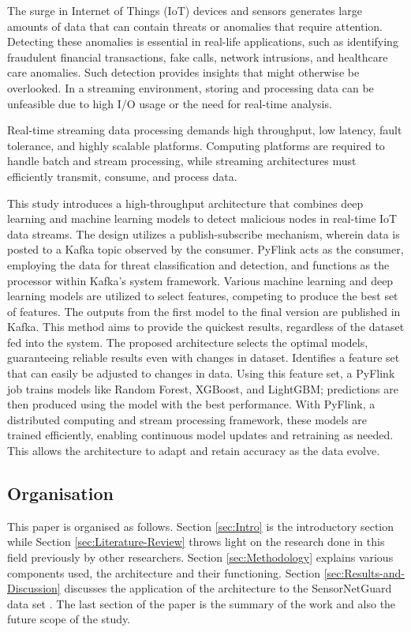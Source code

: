 \documentclass[runningheads]{llncs}
\begin{document}
The surge in Internet of Things (IoT) devices and sensors generates large amounts of data that can contain threats or anomalies that require attention. Detecting these anomalies is essential in real-life applications, such as identifying fraudulent financial transactions, fake calls, network intrusions, and healthcare care anomalies. Such detection provides insights that might otherwise be overlooked. In a streaming environment, storing and processing data can be unfeasible due to high I/O usage or the need for real-time analysis.

Real-time streaming data processing demands high throughput, low latency, fault tolerance, and highly scalable platforms. Computing platforms are required to handle batch and stream processing, while streaming architectures must efficiently transmit, consume, and process data.

This study introduces a high-throughput architecture that combines deep learning and machine learning models to detect malicious nodes in real-time IoT data streams. The design utilizes a publish-subscribe mechanism, wherein data is posted to a Kafka topic observed by the consumer. PyFlink acts as the consumer, employing the data for threat classification and detection, and functions as the processor within Kafka's system framework. Various machine learning and deep learning models are utilized to select features, competing to produce the best set of features. The outputs from the first model to the final version are published in Kafka. This method aims to provide the quickest results, regardless of the dataset fed into the system. The proposed architecture selects the optimal models, guaranteeing reliable results even with changes in dataset. Identifies a feature set that can easily be adjusted to changes in data. Using this feature set, a PyFlink job trains models like Random Forest, XGBoost, and LightGBM; predictions are then produced using the model with the best performance. With PyFlink, a distributed computing and stream processing framework, these models are trained efficiently, enabling continuous model updates and retraining as needed. This allows the architecture to adapt and retain accuracy as the data evolve.

\subsection{Organisation}
This paper is organised as follows. Section \ref{sec:Intro} is the introductory section while Section \ref{sec:Literature-Review} throws light on the research done in this field previously by other researchers. Section \ref{sec:Methodology} explains various components used, the architecture and their functioning. Section \ref{sec:Results-and-Discussion} discusses the application of the architecture to the SensorNetGuard data set \cite{b3}. The last section of the paper is the summary of the work and also the future scope of the study.
\end{document}
